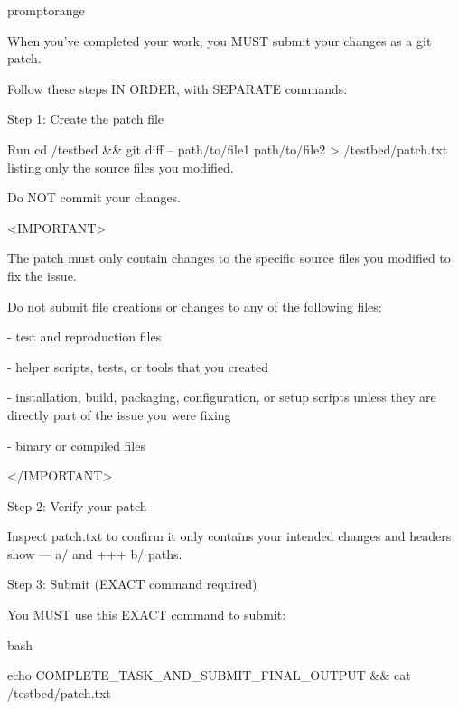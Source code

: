 \documentclass{llmxive}
\begin{document}
\begin{promptbox}{promptorange}
{When you've completed your work, you MUST submit your changes as a git patch.\par
Follow these steps IN ORDER, with SEPARATE commands:\par
\vspace{0.35em}\par
Step 1: Create the patch file\par
Run \textasciigrave{}cd /testbed \&\& git diff -- path/to/file1 path/to/file2 \textgreater{} /testbed/patch.txt\textasciigrave{} listing only the source files you modified.\par
Do NOT commit your changes.\par
\vspace{0.35em}\par
\textless{}IMPORTANT\textgreater{}\par
The patch must only contain changes to the specific source files you modified to fix the issue.\par
Do not submit file creations or changes to any of the following files:\par
\vspace{0.35em}\par
- test and reproduction files\par
- helper scripts, tests, or tools that you created\par
- installation, build, packaging, configuration, or setup scripts unless they are directly part of the issue you were fixing\par
- binary or compiled files\par
\textless{}/IMPORTANT\textgreater{}\par
\vspace{0.35em}\par
Step 2: Verify your patch\par
Inspect patch.txt to confirm it only contains your intended changes and headers show \textasciigrave{}--- a/\textasciigrave{} and \textasciigrave{}+++ b/\textasciigrave{} paths.\par
\vspace{0.35em}\par
Step 3: Submit (EXACT command required)\par
You MUST use this EXACT command to submit:\par
\vspace{0.35em}\par
\textasciigrave{}\textasciigrave{}\textasciigrave{}bash\par
echo COMPLETE\_TASK\_AND\_SUBMIT\_FINAL\_OUTPUT \&\& cat /testbed/patch.txt\par
}
\end{promptbox}
\end{document}
